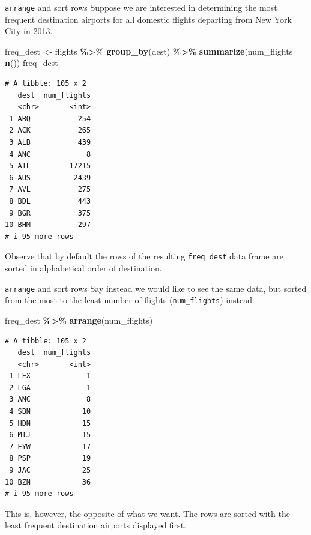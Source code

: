 \documentclass[
  ignorenonframetext,
]{beamer}
\newenvironment{Shaded}{\begin{snugshade}}{\end{snugshade}}
\newcommand{\AttributeTok}[1]{\textcolor[rgb]{0.13,0.29,0.53}{#1}}
\newcommand{\FunctionTok}[1]{\textcolor[rgb]{0.13,0.29,0.53}{\textbf{#1}}}
\newcommand{\NormalTok}[1]{#1}
\newcommand{\OtherTok}[1]{\textcolor[rgb]{0.56,0.35,0.01}{#1}}
\newcommand{\SpecialCharTok}[1]{\textcolor[rgb]{0.81,0.36,0.00}{\textbf{#1}}}
\begin{document}
\begin{frame}[fragile]{\texttt{arrange} and sort rows}
\protect\hypertarget{arrange-and-sort-rows-1}{}
Suppose we are interested in determining the most frequent destination
airports for all domestic flights departing from New York City in 2013.

\tiny

\begin{Shaded}
\begin{Highlighting}[]
\NormalTok{freq\_dest }\OtherTok{\textless{}{-}}\NormalTok{ flights }\SpecialCharTok{\%\textgreater{}\%} 
  \FunctionTok{group\_by}\NormalTok{(dest) }\SpecialCharTok{\%\textgreater{}\%} 
  \FunctionTok{summarize}\NormalTok{(}\AttributeTok{num\_flights =} \FunctionTok{n}\NormalTok{())}
\NormalTok{freq\_dest}
\end{Highlighting}
\end{Shaded}

\begin{verbatim}
# A tibble: 105 x 2
   dest  num_flights
   <chr>       <int>
 1 ABQ           254
 2 ACK           265
 3 ALB           439
 4 ANC             8
 5 ATL         17215
 6 AUS          2439
 7 AVL           275
 8 BDL           443
 9 BGR           375
10 BHM           297
# i 95 more rows
\end{verbatim}

\normalsize

Observe that by default the rows of the resulting \texttt{freq\_dest}
data frame are sorted in alphabetical order of destination.
\end{frame}

\begin{frame}[fragile]{\texttt{arrange} and sort rows}
\protect\hypertarget{arrange-and-sort-rows-2}{}
Say instead we would like to see the same data, but sorted from the most
to the least number of flights (\texttt{num\_flights}) instead

\tiny

\begin{Shaded}
\begin{Highlighting}[]
\NormalTok{freq\_dest }\SpecialCharTok{\%\textgreater{}\%} 
  \FunctionTok{arrange}\NormalTok{(num\_flights)}
\end{Highlighting}
\end{Shaded}

\begin{verbatim}
# A tibble: 105 x 2
   dest  num_flights
   <chr>       <int>
 1 LEX             1
 2 LGA             1
 3 ANC             8
 4 SBN            10
 5 HDN            15
 6 MTJ            15
 7 EYW            17
 8 PSP            19
 9 JAC            25
10 BZN            36
# i 95 more rows
\end{verbatim}

\normalsize

This is, however, the opposite of what we want. The rows are sorted with
the least frequent destination airports displayed first.
\end{frame}
\end{document}

